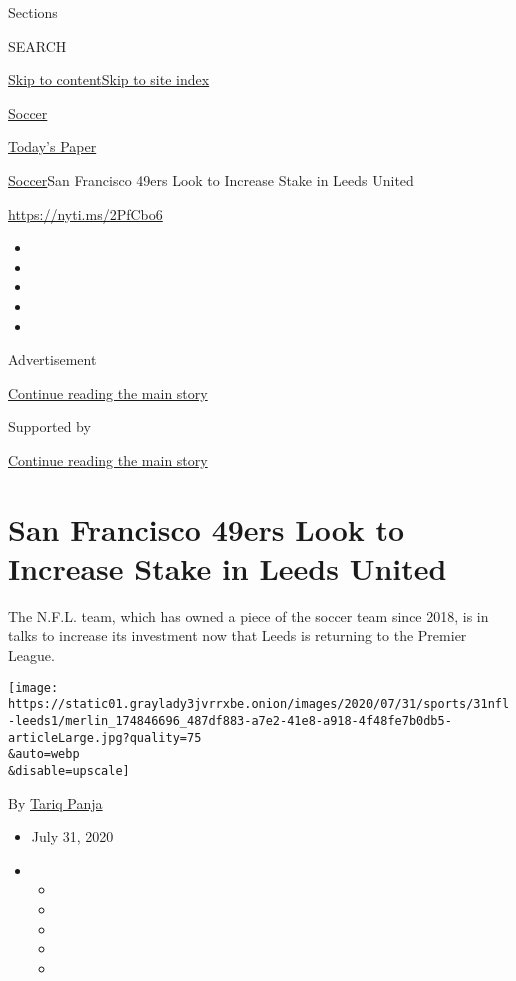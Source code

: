 Sections

SEARCH

\protect\hyperlink{site-content}{Skip to
content}\protect\hyperlink{site-index}{Skip to site index}

\href{https://www.nytimes3xbfgragh.onion/section/sports/soccer}{Soccer}

\href{https://myaccount.nytimes3xbfgragh.onion/auth/login?response_type=cookie\&client_id=vi}{}

\href{https://www.nytimes3xbfgragh.onion/section/todayspaper}{Today's
Paper}

\href{/section/sports/soccer}{Soccer}\textbar{}San Francisco 49ers Look
to Increase Stake in Leeds United

\url{https://nyti.ms/2PfCbo6}

\begin{itemize}
\item
\item
\item
\item
\item
\end{itemize}

Advertisement

\protect\hyperlink{after-top}{Continue reading the main story}

Supported by

\protect\hyperlink{after-sponsor}{Continue reading the main story}

\hypertarget{san-francisco-49ers-look-to-increase-stake-in-leeds-united}{%
\section{San Francisco 49ers Look to Increase Stake in Leeds
United}\label{san-francisco-49ers-look-to-increase-stake-in-leeds-united}}

The N.F.L. team, which has owned a piece of the soccer team since 2018,
is in talks to increase its investment now that Leeds is returning to
the Premier League.

\texttt{[image: https://static01.graylady3jvrrxbe.onion/images/2020/07/31/sports/31nfl-leeds1/merlin\_174846696\_487df883-a7e2-41e8-a918-4f48fe7b0db5-articleLarge.jpg?quality=75\\\&auto=webp\\\&disable=upscale]}

By \href{https://www.nytimes3xbfgragh.onion/by/tariq-panja}{Tariq Panja}

\begin{itemize}
\item
  July 31, 2020
\item
  \begin{itemize}
  \item
  \item
  \item
  \item
  \item
  \end{itemize}
\end{itemize}

